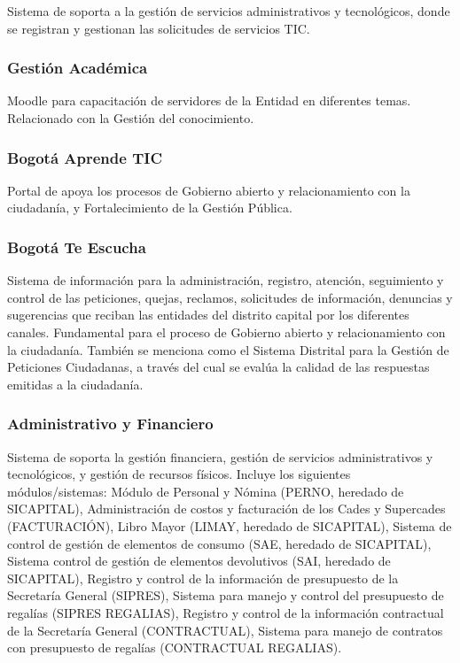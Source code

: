 \documentclass[
	a4paper, %
	12pt, %
]{include/CSSullivanBusinessReport}
\begin{document}
Sistema de soporta a la gestión de servicios administrativos y
tecnológicos, donde se registran y gestionan las solicitudes de
servicios TIC.

\subsubsection{Gestión Académica}\label{sec:gestiuxf3n-acaduxe9mica}

Moodle para capacitación de servidores de la Entidad en diferentes
temas. Relacionado con la Gestión del conocimiento.

\subsubsection{Bogotá Aprende TIC}\label{sec:bogotuxe1-aprende-tic}

Portal de apoya los procesos de Gobierno abierto y relacionamiento con
la ciudadanía, y Fortalecimiento de la Gestión Pública.

\subsubsection{Bogotá Te Escucha}\label{sec:bogotuxe1-te-escucha}

Sistema de información para la administración, registro, atención,
seguimiento y control de las peticiones, quejas, reclamos, solicitudes
de información, denuncias y sugerencias que reciban las entidades del
distrito capital por los diferentes canales. Fundamental para el proceso
de Gobierno abierto y relacionamiento con la ciudadanía. También se
menciona como el Sistema Distrital para la Gestión de Peticiones
Ciudadanas, a través del cual se evalúa la calidad de las respuestas
emitidas a la ciudadanía.

\subsubsection{Administrativo y
Financiero}\label{sec:administrativo-y-financiero}

Sistema de soporta la gestión financiera, gestión de servicios
administrativos y tecnológicos, y gestión de recursos físicos. Incluye
los siguientes módulos/sistemas: Módulo de Personal y Nómina (PERNO,
heredado de SICAPITAL), Administración de costos y facturación de los
Cades y Supercades (FACTURACIÓN), Libro Mayor (LIMAY, heredado de
SICAPITAL), Sistema de control de gestión de elementos de consumo (SAE,
heredado de SICAPITAL), Sistema control de gestión de elementos
devolutivos (SAI, heredado de SICAPITAL), Registro y control de la
información de presupuesto de la Secretaría General (SIPRES), Sistema
para manejo y control del presupuesto de regalías (SIPRES REGALIAS),
Registro y control de la información contractual de la Secretaría
General (CONTRACTUAL), Sistema para manejo de contratos con presupuesto
de regalías (CONTRACTUAL REGALIAS).
\end{document}
